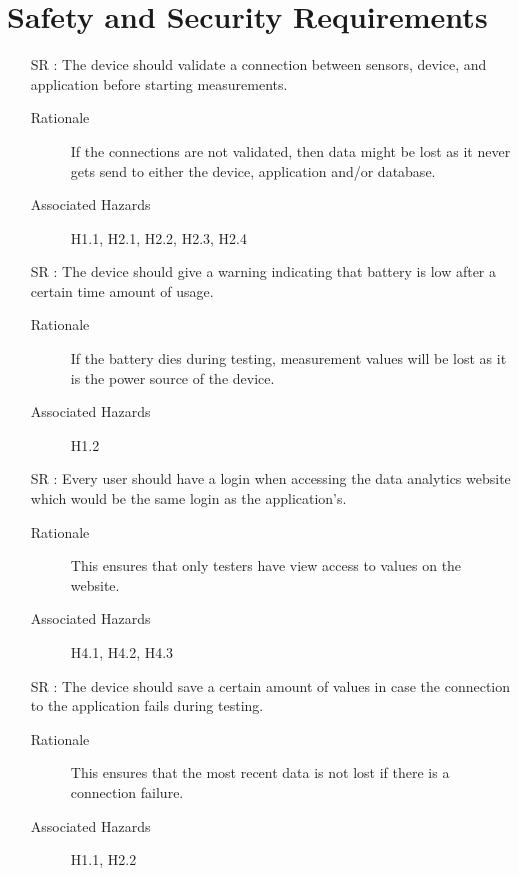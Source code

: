 \documentclass{article}
\newcounter{reqnum} %
\begin{document}

\section{Safety and Security Requirements}

\begin{itemize}
  \item[SR \refstepcounter{reqnum}\thereqnum:] The device should validate a connection between sensors, device, and application before starting measurements.
    \begin{description} \item[Rationale] If the connections are not validated, then data might be lost as it never gets send to either the device, application and/or database.  \end{description}
    \begin{description} \item[Associated Hazards] H1.1, H2.1, H2.2, H2.3, H2.4  \end{description}
  
  \item[SR \refstepcounter{reqnum}\thereqnum:] The device should give a warning indicating that battery is low after a certain time amount of usage.
    \begin{description} \item[Rationale] If the battery dies during testing, measurement values will be lost as it is the power source of the device.  \end{description}
    \begin{description} \item[Associated Hazards] H1.2  \end{description}

  \item[SR \refstepcounter{reqnum}\thereqnum:] Every user should have a login when accessing the data analytics website which would be the same login as the application's.
    \begin{description} \item[Rationale] This ensures that only testers have view access to values on the website.   \end{description}
    \begin{description} \item[Associated Hazards] H4.1, H4.2, H4.3 \end{description}
  
  \item[SR \refstepcounter{reqnum}\thereqnum:] The device should save a certain amount of values in case the connection to the application fails during testing.
    \begin{description} \item[Rationale] This ensures that the most recent data is not lost if there is a connection failure.   \end{description}
    \begin{description} \item[Associated Hazards] H1.1, H2.2  \end{description}
  

\end{itemize}
\end{document}
